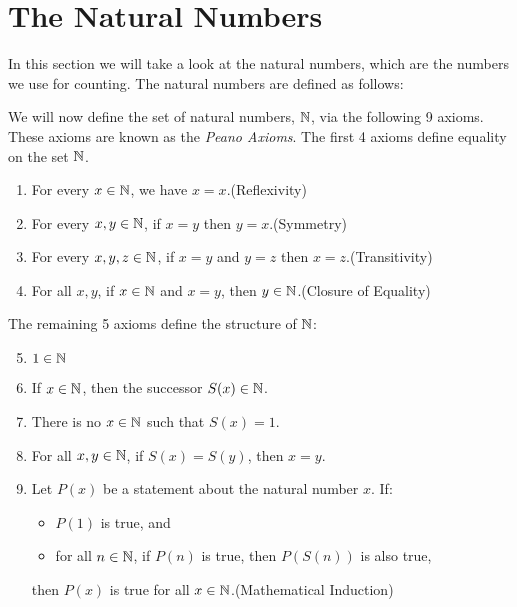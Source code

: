 \newpage
\section{The Natural Numbers}

In this section we will take a look at the natural numbers, which are the numbers we use for counting. 
The natural numbers are defined as follows:
\vspace{\baselineskip}

We will now define the set of natural numbers, \( \mathbb{N} \), via the following 9 axioms. 
These axioms are known as the \emph{Peano Axioms}. The first 4 axioms define equality on 
the set \( \mathbb{N} \).

\begin{enumerate}[label=\Roman*.]
	\item For every \( x \in \mathbb{N} \), we have \( x = x \).\hfill (Reflexivity)
	\item For every \( x, y \in \mathbb{N} \), if \( x = y \) then \( y = x \).\hfill (Symmetry)
	\item For every \( x, y, z \in \mathbb{N} \), if \( x = y \) and \( y = z \) then \( x = z \).\hfill (Transitivity)
	\item For all \( x, y \), if \( x \in \mathbb{N} \) and \( x = y \), then \( y \in \mathbb{N} \).\hfill (Closure of Equality)
\end{enumerate}

The remaining 5 axioms define the structure of \( \mathbb{N} \):

\begin{enumerate}[label=\Roman*.]
	\setcounter{enumi}{4}
	\item \( 1 \in \mathbb{N} \)
	\item If \( x \in \mathbb{N} \), then the successor \( S(x) \in \mathbb{N} \).
	\item There is no \( x \in \mathbb{N} \) such that \( S(x) = 1 \).
	\item For all \( x, y \in \mathbb{N} \), if \( S(x) = S(y) \), then \( x = y \).
	\item Let \( P(x) \) be a statement about the natural number \( x \). If:
		\begin{itemize}
			\item \( P(1) \) is true, and
			\item for all \( n \in \mathbb{N} \), if \( P(n) \) is true, then \( P(S(n)) \) is also true,
		\end{itemize}
		then \( P(x) \) is true for all \( x \in \mathbb{N} \).\hfill (Mathematical Induction)
\end{enumerate}

